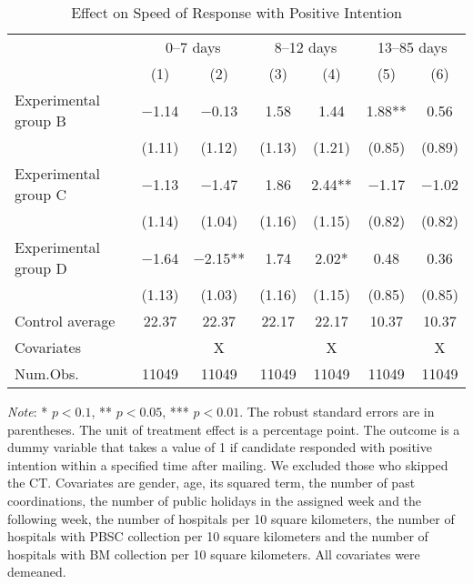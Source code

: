 \documentclass[12pt, a4paper]{article}
\begin{document}
\begin{table}[H]

\caption{\label{tab:lm-positive-time-decompose}Effect on Speed of Response with Positive Intention}
\centering
\fontsize{8}{10}\selectfont
\begin{threeparttable}
\begin{tabular}[t]{>{\raggedright\arraybackslash}p{20em}cccccc}
\toprule
\multicolumn{1}{c}{ } & \multicolumn{2}{c}{0--7 days} & \multicolumn{2}{c}{8--12 days} & \multicolumn{2}{c}{13--85 days} \\
\cmidrule(l{3pt}r{3pt}){2-3} \cmidrule(l{3pt}r{3pt}){4-5} \cmidrule(l{3pt}r{3pt}){6-7}
  & (1) & (2) & (3) & (4) & (5) & (6)\\
\midrule
Experimental group B & \num{-1.14} & \num{-0.13} & \num{1.58} & \num{1.44} & \num{1.88}** & \num{0.56}\\
 & (\num{1.11}) & (\num{1.12}) & (\num{1.13}) & (\num{1.21}) & (\num{0.85}) & (\num{0.89})\\
Experimental group C & \num{-1.13} & \num{-1.47} & \num{1.86} & \num{2.44}** & \num{-1.17} & \num{-1.02}\\
 & (\num{1.14}) & (\num{1.04}) & (\num{1.16}) & (\num{1.15}) & (\num{0.82}) & (\num{0.82})\\
Experimental group D & \num{-1.64} & \num{-2.15}** & \num{1.74} & \num{2.02}* & \num{0.48} & \num{0.36}\\
 & (\num{1.13}) & (\num{1.03}) & (\num{1.16}) & (\num{1.15}) & (\num{0.85}) & (\num{0.85})\\
\midrule
Control average & 22.37 & 22.37 & 22.17 & 22.17 & 10.37 & 10.37\\
Covariates &  & X &  & X &  & X\\
Num.Obs. & \num{11049} & \num{11049} & \num{11049} & \num{11049} & \num{11049} & \num{11049}\\
\bottomrule
\end{tabular}
\begin{tablenotes}
\item \emph{Note}: * $p < 0.1$, ** $p < 0.05$, *** $p < 0.01$. The robust standard errors are in parentheses. The unit of treatment effect is a percentage point. The outcome is a dummy variable that takes a value of 1 if candidate responded with positive intention within a specified time after mailing. We excluded those who skipped the CT. Covariates are gender, age, its squared term, the number of past coordinations, the number of public holidays in the assigned week and the following week, the number of hospitals per 10 square kilometers, the number of hospitals with PBSC collection per 10 square kilometers and the number of hospitals with BM collection per 10 square kilometers. All covariates were demeaned.
\end{tablenotes}
\end{threeparttable}
\end{table}
\end{document}
